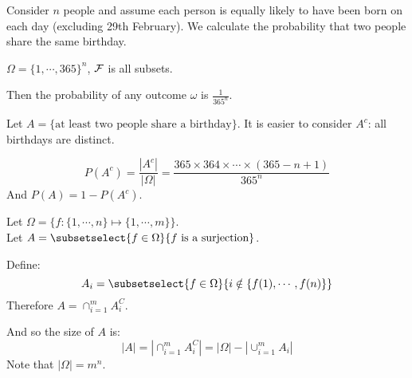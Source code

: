 \documentclass[../Main.tex]{subfiles}
\begin{document}
\begin{example}
    Consider $n$ people and assume each person is equally likely to have been born on each day (excluding 29th February). We calculate the probability that two people share the same birthday.\par
    $\Omega = \{1, \cdots, 365\}^n$, $\mathcal{F}$ is all subsets.\par
    Then the probability of any outcome $\omega$ is $\frac{1}{365^n}$.\par
    Let $A = \{\text{at least two people share a birthday}\}$. It is easier to consider $A^c$: all birthdays are distinct.\par
    \begin{equation*}
        P(A^c) = \frac{|A^c|}{|\Omega|} = \frac{365 \times 364 \times \cdots \times (365-n + 1)}{365^n}
    \end{equation*}
    And $P(A) = 1 - P(A^c)$.
\end{example}
\begin{example}
    Let $\Omega = \{f : \{1, \cdots, n\} \mapsto \{1, \cdots, m\}\}$. \\
    Let $A = \subsetselect{f \in \Omega}{f \text{ is a surjection}}$.\par
    Define:
    \begin{equation*}
        A_i = \subsetselect{f \in \Omega}{i \notin \{f(1), \cdots, f(n)\}}
    \end{equation*}
    Therefore $A = \cap_{i=1}^m A_i^C$.\par
    And so the size of $A$ is:
    \begin{equation*}
        |A| = \left|\cap_{i=1}^m A_i^C\right| = |\Omega| - \left|\cup_{i=1}^m A_i\right|
    \end{equation*}
    Note that $|\Omega| = m^n$.
\end{example}
\end{document}
